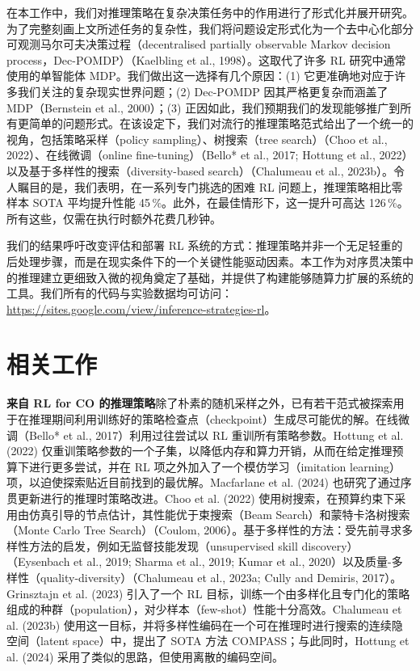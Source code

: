 \documentclass[11pt,UTF8,fontset=fandol]{ctexart}
\begin{document}
在本工作中，我们对推理策略在复杂决策任务中的作用进行了形式化并展开研究。为了完整刻画上文所述任务的复杂性，我们将问题设定形式化为一个去中心化部分可观测马尔可夫决策过程（decentralised partially observable Markov decision process，Dec-POMDP）（Kaelbling et al., 1998）。这取代了许多 RL 研究中通常使用的单智能体 MDP。我们做出这一选择有几个原因：(1) 它更准确地对应于许多我们关注的复杂现实世界问题；(2) Dec-POMDP 因其严格更复杂而涵盖了 MDP（Bernstein et al., 2000）；(3) 正因如此，我们预期我们的发现能够推广到所有更简单的问题形式。在该设定下，我们对流行的推理策略范式给出了一个统一的视角，包括策略采样（policy sampling）、树搜索（tree search）（Choo et al., 2022）、在线微调（online fine-tuning）（Bello* et al., 2017; Hottung et al., 2022）以及基于多样性的搜索（diversity-based search）（Chalumeau et al., 2023b）。令人瞩目的是，我们表明，在一系列专门挑选的困难 RL 问题上，推理策略相比零样本 SOTA 平均提升性能 45\,\%。此外，在最佳情形下，这一提升可高达 126\,\%。所有这些，仅需在执行时额外花费几秒钟。

我们的结果呼吁改变评估和部署 RL 系统的方式：推理策略并非一个无足轻重的后处理步骤，而是在现实条件下的一个关键性能驱动因素。本工作为对序贯决策中的推理建立更细致入微的视角奠定了基础，并提供了构建能够随算力扩展的系统的工具。我们所有的代码与实验数据均可访问：\url{https://sites.google.com/view/inference-strategies-rl}。

\section{相关工作}

\textbf{来自 RL for CO 的推理策略}\quad 除了朴素的随机采样之外，已有若干范式被探索用于在推理期间利用训练好的策略检查点（checkpoint）生成尽可能优的解。在线微调（Bello* et al., 2017）利用过往尝试以 RL 重训所有策略参数。Hottung et al. (2022) 仅重训策略参数的一个子集，以降低内存和算力开销，从而在给定推理预算下进行更多尝试，并在 RL 项之外加入了一个模仿学习（imitation learning）项，以迫使探索贴近目前找到的最优解。Macfarlane et al. (2024) 也研究了通过序贯更新进行的推理时策略改进。Choo et al. (2022) 使用树搜索，在预算约束下采用由仿真引导的节点估计，其性能优于束搜索（Beam Search）和蒙特卡洛树搜索（Monte Carlo Tree Search）（Coulom, 2006）。基于多样性的方法：受先前寻求多样性方法的启发，例如无监督技能发现（unsupervised skill discovery）（Eysenbach et al., 2019; Sharma et al., 2019; Kumar et al., 2020）以及质量-多样性（quality-diversity）（Chalumeau et al., 2023a; Cully and Demiris, 2017）。Grinsztajn et al. (2023) 引入了一个 RL 目标，训练一个由多样化且专门化的策略组成的种群（population），对少样本（few-shot）性能十分高效。Chalumeau et al. (2023b) 使用这一目标，并将多样性编码在一个可在推理时进行搜索的连续隐空间（latent space）中，提出了 SOTA 方法 COMPASS；与此同时，Hottung et al. (2024) 采用了类似的思路，但使用离散的编码空间。
\end{document}
